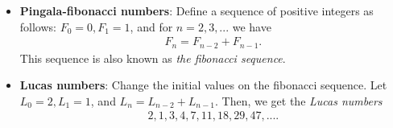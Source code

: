 \documentclass{report}
\begin{document}
\begin{itemize}
\begin{enumerate}
            \end{enumerate}
        \item \textbf{Pingala-fibonacci numbers}: Define a sequence of positive integers as follows: $F_{0} = 0, F_{1} = 1$, and for $n=2,3,... $ we have
            \begin{align*}
                F_{n} = F_{n-2} + F_{n-1}
            .\end{align*}
            This sequence is also known as \textit{the fibonacci sequence}.
        \item \textbf{Lucas numbers}: Change the initial values on the fibonacci sequence. Let $L_{0} = 2, L_{1} = 1$, and $L_{n} = L_{n-2} + L_{n-1}$. Then, we get the \textit{Lucas numbers}
            \begin{align*}
                2,1,3,4,7,11,18,29,47,...
            .\end{align*}

    \end{itemize}
\end{document}
